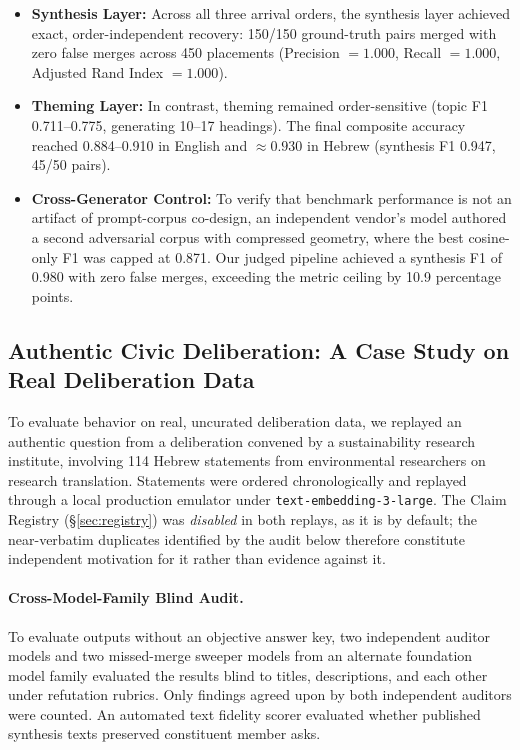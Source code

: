 \documentclass{article}
\begin{document}
\begin{itemize}
\item \textbf{Synthesis Layer:} Across all three arrival orders, the synthesis layer achieved exact, order-independent recovery: 150/150 ground-truth pairs merged with zero false merges across 450 placements (Precision $=1.000$, Recall $=1.000$, Adjusted Rand Index $=1.000$).
\item \textbf{Theming Layer:} In contrast, theming remained order-sensitive (topic F1 0.711--0.775, generating 10--17 headings). The final composite accuracy reached 0.884--0.910 in English and $\approx 0.930$ in Hebrew (synthesis F1 0.947, 45/50 pairs).
\item \textbf{Cross-Generator Control:} To verify that benchmark performance is not an artifact of prompt-corpus co-design, an independent vendor's model authored a second adversarial corpus with compressed geometry, where the best cosine-only F1 was capped at 0.871. Our judged pipeline achieved a synthesis F1 of 0.980 with zero false merges, exceeding the metric ceiling by 10.9 percentage points.
\end{itemize}

\subsection{Authentic Civic Deliberation: A Case Study on Real Deliberation Data}
\label{sec:realdata}

To evaluate behavior on real, uncurated deliberation data, we replayed an authentic question from a deliberation convened by a sustainability research institute, involving 114 Hebrew statements from environmental researchers on research translation. Statements were ordered chronologically and replayed through a local production emulator under \texttt{text-embedding-3-large}. %
The Claim Registry (\S\ref{sec:registry}) was \emph{disabled} in both replays, as it is by default; the near-verbatim duplicates identified by the audit below therefore constitute independent motivation for it rather than evidence against it.

\paragraph{Cross-Model-Family Blind Audit.} To evaluate outputs without an objective answer key, two independent auditor models and two missed-merge sweeper models from an alternate foundation model family evaluated the results blind to titles, descriptions, and each other under refutation rubrics. Only findings agreed upon by both independent auditors were counted. An automated text fidelity scorer evaluated whether published synthesis texts preserved constituent member asks.
\end{document}
